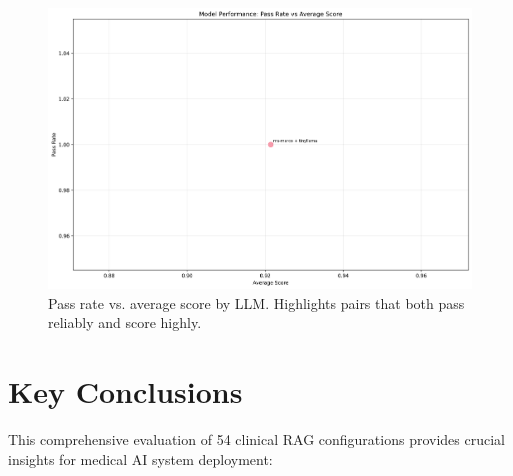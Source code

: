 \begin{figure}[!htbp]
  \centering
  \includegraphics[width=\textwidth]{chap4_results/images/pass_rate_vs_score.png}
  \caption{Pass rate vs. average score by LLM. Highlights pairs that both pass reliably and score highly.}
  \label{fig:pass_rate_vs_score}
\end{figure}

\section{Key Conclusions}

This comprehensive evaluation of 54 clinical RAG configurations provides crucial insights for medical AI system deployment:

